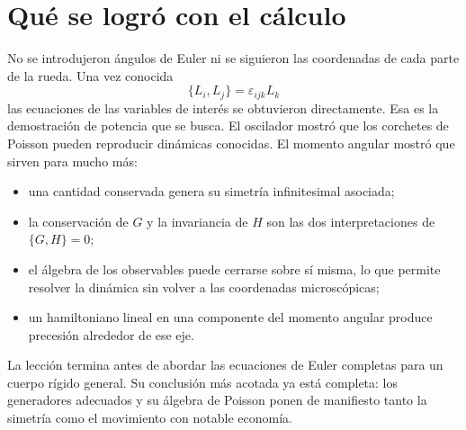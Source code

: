 \begin{classroomqa}
\end{classroomqa}

\begin{classroomqa}
\end{classroomqa}

\section{Qué se logró con el cálculo}

No se introdujeron ángulos de Euler ni se siguieron las coordenadas de cada parte de la rueda. Una vez conocida
\[
  \{L_i,L_j\}=\varepsilon_{ijk}L_k
\]
las ecuaciones de las variables de interés se obtuvieron directamente. Esa es la demostración de potencia que se busca. El oscilador mostró que los corchetes de Poisson pueden reproducir dinámicas conocidas. El momento angular mostró que sirven para mucho más:
\begin{itemize}
  \item una cantidad conservada genera su simetría infinitesimal asociada;
  \item la conservación de \(G\) y la invariancia de \(H\) son las dos interpretaciones de \(\{G,H\}=0\);
  \item el álgebra de los observables puede cerrarse sobre sí misma, lo que permite resolver la dinámica sin volver a las coordenadas microscópicas;
  \item un hamiltoniano lineal en una componente del momento angular produce precesión alrededor de ese eje.
\end{itemize}
La lección termina antes de abordar las ecuaciones de Euler completas para un cuerpo rígido general. Su conclusión más acotada ya está completa: los generadores adecuados y su álgebra de Poisson ponen de manifiesto tanto la simetría como el movimiento con notable economía.
